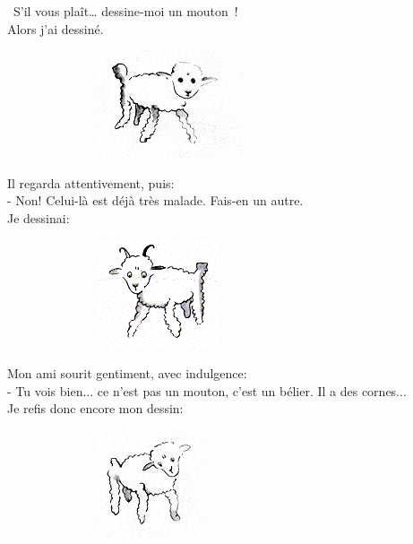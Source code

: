 \documentclass[11pt]{article}
\begin{document}
\begin{multicols}{2}
  \og S'il vous plaît… dessine-moi un mouton ! \fg \\
  Alors j'ai dessiné.
  
  \begin{figure}[H]
        \centering
        \includegraphics[width=0.3\linewidth]{3x11-equations/dm-mouton2.png}
  \end{figure}

  Il regarda attentivement, puis: \\
  - Non! Celui-là est déjà très malade. Fais-en un autre. \\
  Je dessinai:

  \begin{figure}[H]
        \centering
        \includegraphics[width=0.3\linewidth]{3x11-equations/dm-mouton1.png}
  \end{figure}

  Mon ami sourit gentiment, avec indulgence: \\
  - Tu vois bien... ce n'est pas un mouton, c'est un bélier. Il a des cornes... \\
  Je refis donc encore mon dessin:

  \begin{figure}[H]
        \centering
        \includegraphics[width=0.3\linewidth]{3x11-equations/dm-mouton3.png}
  \end{figure}
  

\end{multicols}
\end{document}
